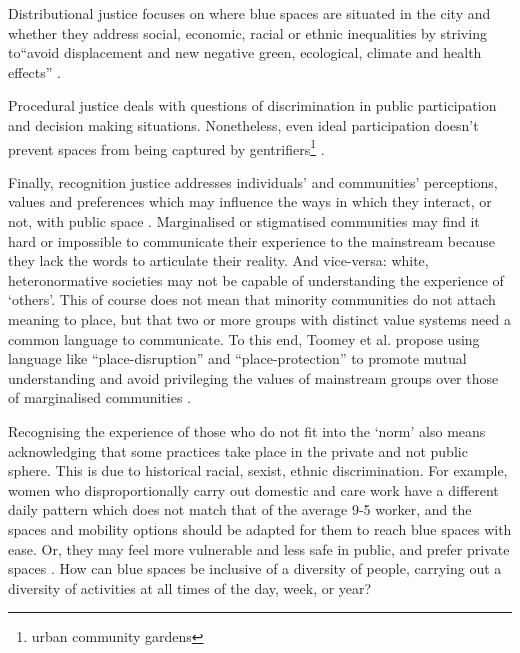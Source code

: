 \documentclass{article}
\begin{document}
Distributional justice focuses on where blue spaces are situated in the city and whether they address social, economic, racial or ethnic inequalities by striving to``avoid displacement and new negative green, ecological, climate and health effects'' \parencite{anguelovski2020expanding}.

Procedural justice deals with questions of discrimination in public participation and decision making situations. Nonetheless, even ideal participation doesn't prevent spaces from being captured by gentrifiers\footnote{urban community gardens} \parencite{anguelovski2020expanding}.

Finally, recognition justice addresses individuals' and communities’ perceptions, values and preferences which may influence the ways in which they interact, or not, with public space \parencite{anguelovski2020expanding}.
Marginalised or stigmatised communities may find it hard or impossible to communicate their experience to the mainstream because they lack the words to articulate their reality. And vice-versa: white, heteronormative societies may not be capable of understanding the experience of `others'. This of course does not mean that minority communities do not attach meaning to place, but that two or more groups with distinct value systems need a common language to communicate. To this end, Toomey et al. propose using language like ``place-disruption'' and ``place-protection'' to promote mutual understanding and avoid privileging the values of mainstream groups over those of marginalised communities \parencite{toomey2021place}.

Recognising the experience of those who do not fit into the `norm' also means acknowledging that some practices take place in the private and not public sphere. This is due to historical racial, sexist, ethnic discrimination. For example, women who disproportionally carry out domestic and care work have a different daily pattern which does not match that of the average 9-5 worker, and the spaces and mobility options should be adapted for them to reach blue spaces with ease. Or, they may feel more vulnerable and less safe in public, and prefer private spaces \parencite{wessells2014urban}. How can blue spaces be inclusive of a diversity of people, carrying out a diversity of activities at all times of the day, week, or year? 

	
\end{document}

